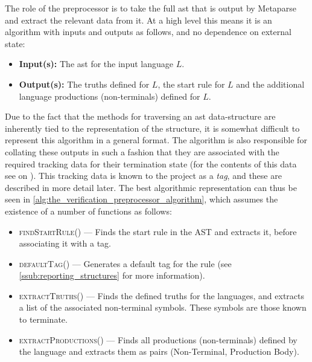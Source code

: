 The role of the preprocessor is to take the full \gls{ast} that is output by Metaparse and extract the relevant data from it. 
At a high level this means it is an algorithm with inputs and outputs as follows, and no dependence on external state:
\begin{itemize}
    \item \textbf{Input(s):} The \gls{ast} for the input language $L$.
    \item \textbf{Output(s):} The truths defined for $L$, the start rule for $L$ and the additional language productions (non-terminals) defined for $L$. 
\end{itemize}

Due to the fact that the methods for traversing an \gls{ast} data-structure are inherently tied to the representation of the structure, it is somewhat difficult to represent this algorithm in a general format.
The algorithm is also responsible for collating these outputs in such a fashion that they are associated with the required tracking data for their termination state (for the contents of this data see  on ).
This tracking data is known to the project as a \textit{tag}, and these are described in more detail later. 
The best algorithmic representation can thus be seen in \autoref{alg:the_verification_preprocessor_algorithm}, which assumes the existence of a number of functions as follows:
\begin{itemize}
    \item \textsc{findStartRule}() --- Finds the start rule in the AST and extracts it, before associating it with a tag.
    \item \textsc{defaultTag}() --- Generates a default tag for the rule (see \autoref{ssub:reporting_structures} for more information).
    \item \textsc{extractTruths}() --- Finds the defined truths for the languages, and extracts a list of the associated non-terminal symbols.
    These symbols are those known to terminate.
    \item \textsc{extractProductions}() --- Finds all productions (non-terminals) defined by the language and extracts them as pairs (Non-Terminal, Production Body). 
\end{itemize}

